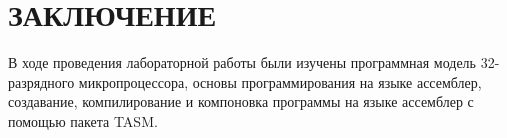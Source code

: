 \section*{ЗАКЛЮЧЕНИЕ}

В ходе проведения лабораторной работы были изучены
программная модель 32-разрядного микропроцессора,
основы программирования на языке ассемблер,
создавание, компилирование и компоновка программы
на языке ассемблер с помощью пакета TASM.

\newpage

